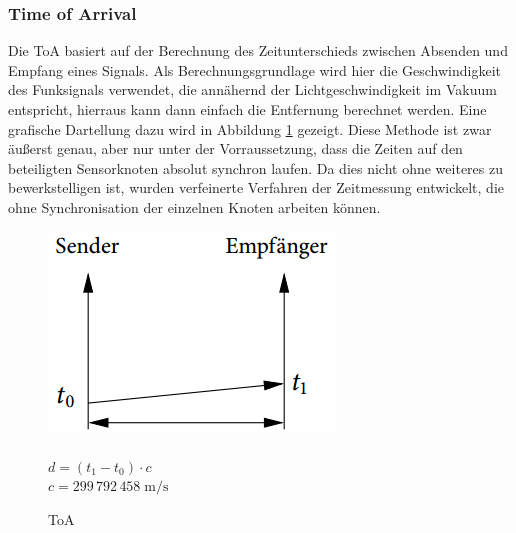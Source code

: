\subsubsection{Time of Arrival}
Die \ac{ToA} basiert auf der Berechnung des Zeitunterschieds zwischen Absenden und Empfang eines Signals. Als Berechnungsgrundlage wird hier
die Geschwindigkeit des Funksignals verwendet, die annähernd der Lichtgeschwindigkeit im Vakuum entspricht, hierraus kann dann einfach die 
Entfernung berechnet werden. Eine grafische Dartellung dazu wird in Abbildung \ref{fig:ToA} gezeigt. Diese Methode ist zwar äußerst genau, aber nur unter der Vorraussetzung, dass die Zeiten auf den beteiligten Sensorknoten absolut synchron laufen. Da dies nicht ohne weiteres zu bewerkstelligen ist, wurden verfeinerte Verfahren der Zeitmessung entwickelt, die ohne Synchronisation der einzelnen Knoten arbeiten können. 
\begin{figure}[h!]    
  \caption{ToA}
    \includegraphics[scale=0.35]{img/time1}\\~\\
    \label{fig:ToA}
    $d = (t_{1} - t_{0}) \cdot c$\\
    $c=299\,792\,458\;\mathrm{m/s}$
    
\end{figure}
